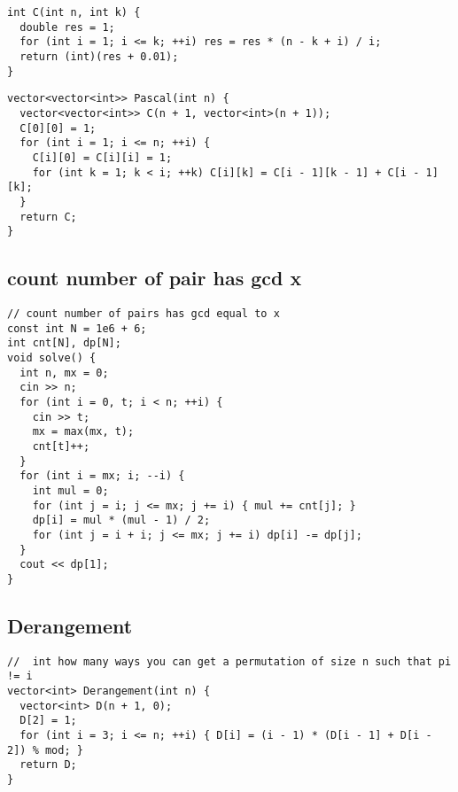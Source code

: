 \documentclass[twoside]{article}
\begin{document}
\begin{multicols*}{2}
\begin{verbatim}
int C(int n, int k) {
  double res = 1;
  for (int i = 1; i <= k; ++i) res = res * (n - k + i) / i;
  return (int)(res + 0.01);
}
\end{verbatim}
\vspace{-12pt}
\begin{verbatim}
vector<vector<int>> Pascal(int n) {
  vector<vector<int>> C(n + 1, vector<int>(n + 1));
  C[0][0] = 1;
  for (int i = 1; i <= n; ++i) {
    C[i][0] = C[i][i] = 1;
    for (int k = 1; k < i; ++k) C[i][k] = C[i - 1][k - 1] + C[i - 1][k];
  }
  return C;
}
\end{verbatim}

{
\subsection*{count number of pair has gcd x}
}
\begin{verbatim}
// count number of pairs has gcd equal to x
const int N = 1e6 + 6;
int cnt[N], dp[N];
void solve() {
  int n, mx = 0;
  cin >> n;
  for (int i = 0, t; i < n; ++i) {
    cin >> t;
    mx = max(mx, t);
    cnt[t]++;
  }
  for (int i = mx; i; --i) {
    int mul = 0;
    for (int j = i; j <= mx; j += i) { mul += cnt[j]; }
    dp[i] = mul * (mul - 1) / 2;
    for (int j = i + i; j <= mx; j += i) dp[i] -= dp[j];
  }
  cout << dp[1];
}

\end{verbatim}

{
\subsection*{Derangement}
}
\begin{verbatim}
//  int how many ways you can get a permutation of size n such that pi != i
vector<int> Derangement(int n) {
  vector<int> D(n + 1, 0);
  D[2] = 1;
  for (int i = 3; i <= n; ++i) { D[i] = (i - 1) * (D[i - 1] + D[i - 2]) % mod; }
  return D;
}
\end{verbatim}


\end{multicols*}
\end{document}
